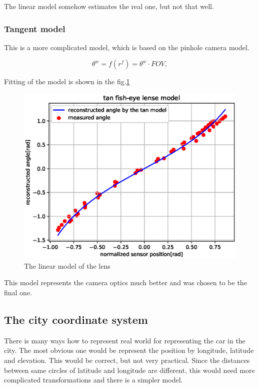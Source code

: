 \documentclass[a4paper,12pt,titlepage]{article}
\numberwithin{figure}{section}
\begin{document}
The linear model somehow estimates the real one, but not that well.

\subsubsection{Tangent model}

This is a more complicated model, which is based on the pinhole camera model.

\begin{equation}
\theta^w = f(r^f) = \theta^w \cdot FOV,
\end{equation}

Fitting of the model is shown in the fig.\ref{fig:linear_model}

\begin{figure}[h!]
\centering
\includegraphics[width=1\linewidth]{fig/tan_model2.eps}
\caption{The linear model of the lens}
\label{fig:linear_model}
\end{figure}

This model represents the camera optics much better and was chosen to be the final one.

\subsection{The city coordinate system}

There is many ways how to represent real world for representing the car in the city. The most obvious one would be represent the position by longitude, latitude and elevation. This would be correct, but not very practical. Since the distances between same circles of latitude and longitude are different, this would need more complicated transformations and there is a simpler model. 
\end{document}
